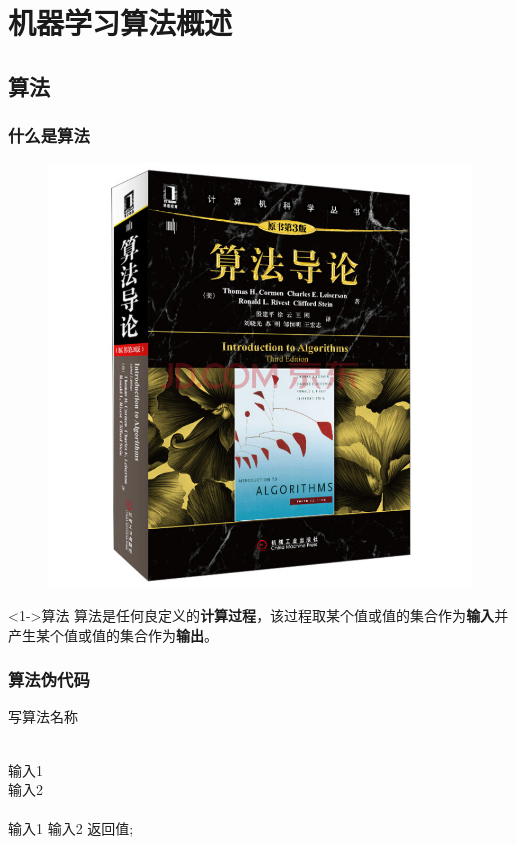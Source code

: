 \documentclass[10pt,aspectratio=43,mathserif,table]{beamer}
\begin{document}
\section{机器学习算法概述}
\subsection{算法}
\begin{frame}
	\frametitle{什么是算法}
	\begin{figure}[htbp]
		\centering
		\includegraphics[width=0.3\paperwidth]{figures/algbook.jpg}
	\end{figure}

		\begin{block}<1->{算法}
				算法是任何良定义的{\color{blue}\textbf{计算过程}}，该过程取某个值或值的集合作为{\color{blue}\textbf{输入}}并产生某个值或值的集合作为{\color{blue}\textbf{输出}}。
		\end{block}
\end{frame}
\begin{frame}
	\frametitle{算法伪代码}
    \begin{algorithm}[htb] 
		\caption{写算法名称} 
		\label{alg:Framwork} 
		\begin{algorithmic}[1] %
		\REQUIRE ~~\\ %
		输入1 \\
		输入2 \\
		\ENSURE ~~\\ %
		\STATE 输入1
		\STATE 输入2
		\RETURN 返回值; %
		\end{algorithmic}
		\end{algorithm}
\end{frame}
\end{document}
